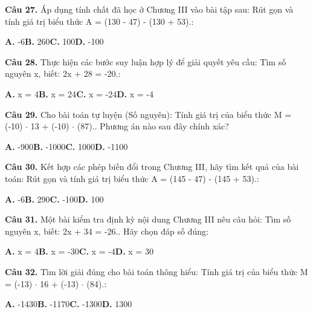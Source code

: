 \documentclass[11pt,a4paper]{article}
\begin{document}
\textbf{\color{primary} Câu 27.} Áp dụng tính chất đã học ở Chương III vào bài tập sau: Rút gọn và tính giá trị biểu thức A = (130 - 47) - (130 + 53).:\par
\hspace*{1.5em}\textbf{A.} -6\quad\quad \textbf{B.} 260\quad\quad \textbf{C.} 100\quad\quad \textbf{D.} -100\par\vspace{2pt}
\textbf{\color{primary} Câu 28.} Thực hiện các bước suy luận hợp lý để giải quyết yêu cầu: Tìm số nguyên x, biết: 2x + 28 = -20.:\par
\hspace*{1.5em}\textbf{A.} x = 4\quad\quad \textbf{B.} x = 24\quad\quad \textbf{C.} x = -24\quad\quad \textbf{D.} x = -4\par\vspace{2pt}
\textbf{\color{primary} Câu 29.} Cho bài toán tự luyện (Số nguyên): Tính giá trị của biểu thức M = (-10) $\cdot$ 13 + (-10) $\cdot$ (87).. Phương án nào sau đây chính xác?\par
\hspace*{1.5em}\textbf{A.} -900\quad\quad \textbf{B.} -1000\quad\quad \textbf{C.} 1000\quad\quad \textbf{D.} -1100\par\vspace{2pt}
\textbf{\color{primary} Câu 30.} Kết hợp các phép biến đổi trong Chương III, hãy tìm kết quả của bài toán: Rút gọn và tính giá trị biểu thức A = (145 - 47) - (145 + 53).:\par
\hspace*{1.5em}\textbf{A.} -6\quad\quad \textbf{B.} 290\quad\quad \textbf{C.} -100\quad\quad \textbf{D.} 100\par\vspace{2pt}
\textbf{\color{primary} Câu 31.} Một bài kiểm tra định kỳ nội dung Chương III nêu câu hỏi: Tìm số nguyên x, biết: 2x + 34 = -26.. Hãy chọn đáp số đúng:\par
\hspace*{1.5em}\textbf{A.} x = 4\quad\quad \textbf{B.} x = -30\quad\quad \textbf{C.} x = -4\quad\quad \textbf{D.} x = 30\par\vspace{2pt}
\textbf{\color{primary} Câu 32.} Tìm lời giải đúng cho bài toán thông hiểu: Tính giá trị của biểu thức M = (-13) $\cdot$ 16 + (-13) $\cdot$ (84).:\par
\hspace*{1.5em}\textbf{A.} -1430\quad\quad \textbf{B.} -1170\quad\quad \textbf{C.} -1300\quad\quad \textbf{D.} 1300\par\vspace{2pt}
\end{document}
